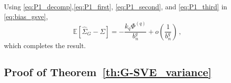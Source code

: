 \documentclass[11pt]{article}
\theoremstyle{remark}
\begin{document}
%
Using \eqref{eq:P1_decomp},\eqref{eq:P1_first}, \eqref{eq:P1_second}, and \eqref{eq:P1_third} in \eqref{eq:bias_gsve},
\[
\mathbb{E} \left[\hat{\Sigma}_{G} - \Sigma \right] = -\dfrac{k_q \Phi^{(q)} }{b_n^q} + o\left( \dfrac{1}{b_n^q} \right)\,,
\]
which completes the result.
%

\subsection{Proof of Theorem~\ref{th:G-SVE_variance}}
\label{appendix:variance}
 
\end{document}
